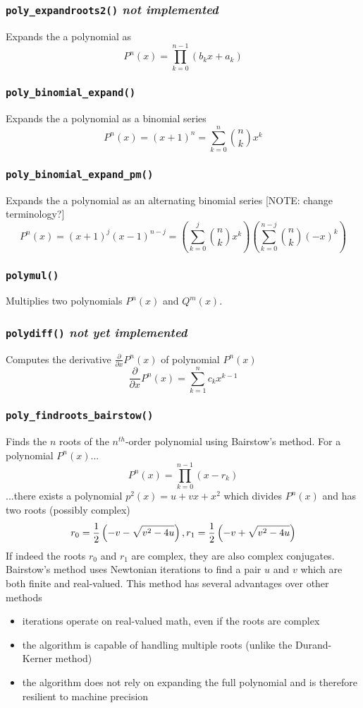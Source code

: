 \subsubsection{{\tt poly\_expandroots2()} {\it not implemented}}
Expands the a polynomial as
\[
    P^n(x) = \prod_{k=0}^{n-1}{(b_kx+a_k)}
\]

\subsubsection{{\tt poly\_binomial\_expand()}}
Expands the a polynomial as a binomial series
\[
    P^n(x) = (x+1)^n = \sum_{k=0}^{n}{ {n \choose k} x^k}
\]

\subsubsection{{\tt poly\_binomial\_expand\_pm()}}
Expands the a polynomial as an alternating binomial series
[NOTE: change terminology?]
\[
    P^n(x) = (x+1)^j (x-1)^{n-j}
           = \left( \sum_{k=0}^{j}  { {n \choose k}    x^k} \right)
             \left( \sum_{k=0}^{n-j}{ {n \choose k} (-x)^k} \right)
\]

\subsubsection{{\tt polymul()}}
Multiplies two polynomials $P^n(x)$ and $Q^m(x)$.

\subsubsection{{\tt polydiff()} {\it not yet implemented}}
Computes the derivative $\frac{\partial}{\partial x}P^n(x)$ of polynomial
$P^n(x)$
\[
    \frac{\partial}{\partial x}P^n(x) = \sum_{k=1}^{n}{c_{k}x^{k-1}}
\]

\subsubsection{{\tt poly\_findroots\_bairstow()}}
Finds the $n$ roots of the $n^{th}$-order polynomial using Bairstow's method.
For a polynomial $P^n(x)$...
\[
    P^n(x) = \prod_{k=0}^{n-1}{(x-r_k)}
\]
...there exists a polynomial $p^{2}(x)=u + vx + x^2$ which divides
$P^{n}(x)$ and has two roots (possibly complex)
\[
    r_0 = \frac{1}{2}\left(-v-\sqrt{v^2-4u}\right), \; \\
    r_1 = \frac{1}{2}\left(-v+\sqrt{v^2-4u}\right)
\]
If indeed the roots $r_0$ and $r_1$ are complex, they are also complex
conjugates.
Bairstow's method uses Newtonian iterations to find a pair $u$ and $v$ which
are both finite and real-valued.
This method has several advantages over other methods
\begin{itemize}
\item iterations operate on real-valued math, even if the roots are complex
\item the algorithm is capable of handling multiple roots (unlike the
      Durand-Kerner method)
\item the algorithm does not rely on expanding the full polynomial and is
      therefore resilient to machine precision
\end{itemize}


